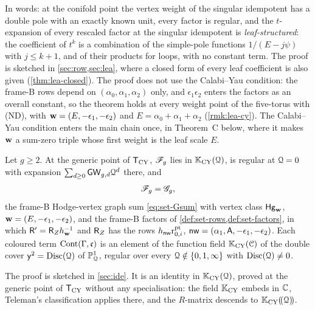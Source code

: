 In words: at the conifold point the vertex weight of the singular idempotent has a double pole with an exactly known unit, every factor is regular, and the $t$-expansion of every rescaled factor at the singular idempotent is \emph{leaf-structured}: the coefficient of $t^k$ is a combination of the simple-pole functions $1/(E-j\psi)$ with $j\leq k+1$, and of their products for loops, with no constant term. The proof is sketched in \cref{sec:row,sec:lea}, where a closed form of every leaf coefficient is also given (\cref{thm:lea-closed}). The proof does not use the Calabi--Yau condition: the frame-B rows depend on $(\alpha_0,\alpha_1,\alpha_2)$ only, and $\epsilon_1\epsilon_2$ enters the factors as an overall constant, so the theorem holds at every weight point of the five-torus with (ND), with $\mathbf{w}=(E,-\epsilon_1,-\epsilon_2)$ and $E=\alpha_0+\alpha_1+\alpha_2$ (\cref{rmk:lea-cy}). The Calabi--Yau condition enters the main chain once, in Theorem~C below, where it makes $\mathbf{w}$ a sum-zero triple whose first weight is the leaf scale $E$.

\begin{thm}
\label{thm:int-ident}
Let $g\geq2$. At the generic point of $\mathsf{T}_{\mathrm{CY}}$, $\mathscr{F}_g$ lies in $\mathbb{K}_{\mathrm{CY}}(\mathcal{Q})$, is regular at $\mathcal{Q}=0$ with expansion $\sum_{d\geq0}\mathsf{GW}_{g,d}\mathcal{Q}^d$ there, and
\[
\mathscr{F}_g=\mathscr{G}_g ,
\]
the frame-B Hodge-vertex graph sum \eqref{eq:set-Gsum} with vertex class $\mathsf{Hg}_{\mathbf{w}}$, $\mathbf{w}=(E,-\epsilon_1,-\epsilon_2)$, and the frame-B factors of \cref{def:set-rows,def:set-factors}, in which $\mathsf{R}'=\mathsf{R}_{Z}h_{\mathbf{w}}^{-1}$ and $\mathsf{R}_{Z}$ has the rows $h_{\mathsf{nw}}\mathrm{r}^{\mathrm{pt}}_{0,i}$, $\mathsf{nw}=(\alpha_1,\mathsf{A},-\epsilon_1,-\epsilon_2)$. Each coloured term $\mathrm{Cont}(\Gamma,\mathfrak{c})$ is an element of the function field $\mathbb{K}_{\mathrm{CY}}(\mathcal{C})$ of the double cover $\mathsf{y}^2=\operatorname{Disc}(\mathcal{Q})$ of $\mathbb{P}^1_{\mathcal{Q}}$, regular over every $\mathcal{Q}\notin\{0,1,\infty\}$ with $\operatorname{Disc}(\mathcal{Q})\neq0$.
\end{thm}

The proof is sketched in \cref{sec:ide}. It is an identity in $\mathbb{K}_{\mathrm{CY}}(\mathcal{Q})$, proved at the generic point of $\mathsf{T}_{\mathrm{CY}}$ without any specialisation: the field $\mathbb{K}_{\mathrm{CY}}$ embeds in $\mathbb{C}$, Teleman's classification applies there, and the $R$-matrix descends to $\mathbb{K}_{\mathrm{CY}}(\!(\mathcal{Q})\!)$.

